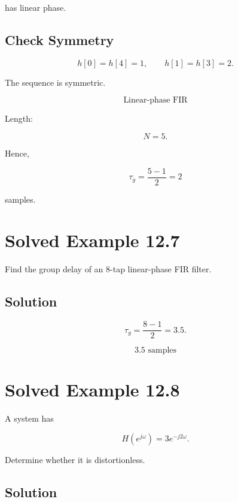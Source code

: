 has linear phase.


\subsection{Check Symmetry}

\[
h[0]=h[4]=1,
\qquad
h[1]=h[3]=2.
\]

The sequence is symmetric.

\[
\boxed{
\text{Linear-phase FIR}
}
\]

Length:

\[
N=5.
\]

Hence,

\[
\boxed{
\tau_g=\frac{5-1}{2}=2
}
\]

samples.


\section{Solved Example 12.7}

Find the group delay of an 8-tap linear-phase FIR filter.


\subsection{Solution}

\[
\tau_g=
\frac{8-1}{2}
=
3.5.
\]

\[
\boxed{
3.5\text{ samples}
}
\]


\section{Solved Example 12.8}

A system has

\[
H(e^{j\omega})=
3e^{-j2\omega}.
\]

Determine whether it is distortionless.


\subsection{Solution}


